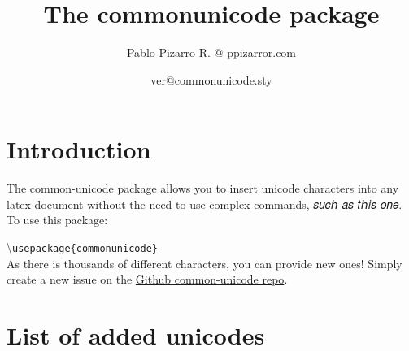 \documentclass{article}
\title{The commonunicode package}
\author{Pablo Pizarro R. @ \href{https://ppizarror.com/}{ppizarror.com}}
\date{\csname ver@commonunicode.sty\endcsname}
\begin{document}
	
\maketitle
\tableofcontents

\section{Introduction}

The common-unicode package allows you to insert unicode characters into any latex document without the need to use complex commands, 𝑠𝑢𝑐𝘩 𝑎𝑠 𝑡𝘩𝑖𝑠 𝑜𝑛𝑒. \\

\noindent To use this package:

\textbackslash\texttt{usepackage\{commonunicode\}} \\

As there is thousands of different characters, you can provide new ones! Simply create a new issue on the \href{https://github.com/ppizarror/common-unicode}{Github common-unicode repo}.

\section{List of added unicodes}

\end{document}
